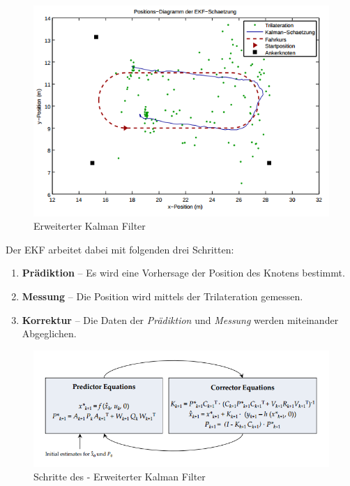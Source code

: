 \begin{figure}[h!]
  \centering
  \includegraphics[scale=0.7]{img/kalman}

  \caption{Erweiterter Kalman Filter}
  \label{fig:ekf}
\end{figure}

\newpage
Der \ac{EKF} arbeitet dabei mit folgenden drei Schritten:

\begin{enumerate}
\item \textbf{Prädiktion} -- Es wird eine Vorhersage der Position des
  Knotens bestimmt.
\item \textbf{Messung} -- Die Position wird mittels der
  Trilateration gemessen.
\item \textbf{Korrektur} -- Die Daten der \textit{Prädiktion} und
  \textit{Messung} werden miteinander Abgeglichen.
\end{enumerate}

\begin{figure}[h!]
  \centering
  \includegraphics[scale=0.6]{img/kalman2}

  \caption{Schritte des - Erweiterter Kalman Filter}
  \label{fig:ekf}
\end{figure}

